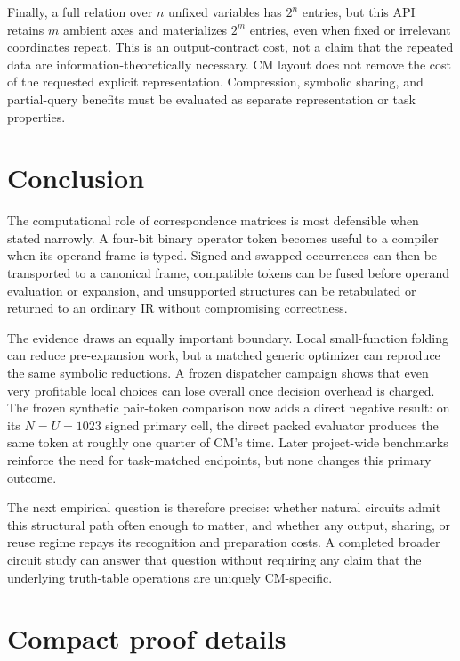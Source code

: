 \documentclass[10pt]{article}
\theoremstyle{plain}
\theoremstyle{definition}
\theoremstyle{remark}
\begin{document}
Finally, a full relation over $n$ unfixed variables has $2^n$ entries, but this API retains $m$ ambient axes and materializes $2^m$ entries, even when fixed or irrelevant coordinates repeat. This is an output-contract cost, not a claim that the repeated data are information-theoretically necessary. CM layout does not remove the cost of the requested explicit representation. Compression, symbolic sharing, and partial-query benefits must be evaluated as separate representation or task properties.

\section{Conclusion}

The computational role of correspondence matrices is most defensible when stated narrowly. A four-bit binary operator token becomes useful to a compiler when its operand frame is typed. Signed and swapped occurrences can then be transported to a canonical frame, compatible tokens can be fused before operand evaluation or expansion, and unsupported structures can be retabulated or returned to an ordinary IR without compromising correctness.

The evidence draws an equally important boundary. Local small-function folding can reduce pre-expansion work, but a matched generic optimizer can reproduce the same symbolic reductions. A frozen dispatcher campaign shows that even very profitable local choices can lose overall once decision overhead is charged. The frozen synthetic pair-token comparison now adds a direct negative result: on its $N=U=1023$ signed primary cell, the direct packed evaluator produces the same token at roughly one quarter of CM's time. Later project-wide benchmarks reinforce the need for task-matched endpoints, but none changes this primary outcome.

The next empirical question is therefore precise: whether natural circuits admit this structural path often enough to matter, and whether any output, sharing, or reuse regime repays its recognition and preparation costs. A completed broader circuit study can answer that question without requiring any claim that the underlying truth-table operations are uniquely CM-specific.

\appendix

\section{Compact proof details}
\end{document}

